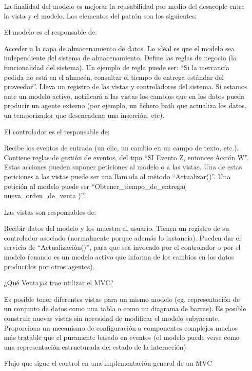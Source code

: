La finalidad del modelo es mejorar la reusabilidad por medio del desacople entre la vista y el modelo. Los elementos del patrón son
los siguientes:

El modelo es el responsable de:

    Acceder a la capa de almacenamiento de datos. Lo ideal es que el modelo sea independiente del sistema de almacenamiento.
    Define las reglas de negocio (la funcionalidad del sistema). Un ejemplo de regla puede ser: “Si la mercancía pedida no está en 
    el almacén, consultar el tiempo de entrega estándar del proveedor”.
    Lleva un registro de las vistas y controladores del sistema.
    Si estamos ante un modelo activo, notificará a las vistas los cambios que en los datos pueda producir un agente externo (por 
    ejemplo, un fichero bath que actualiza los datos, un temporizador que desencadena una inserción, etc).

El controlador es el responsable de:

    Recibe los eventos de entrada (un clic, un cambio en un campo de texto, etc.).
    Contiene reglas de gestión de eventos, del tipo “SI Evento Z, entonces Acción W”. Estas acciones pueden suponer peticiones al 
    modelo o a las vistas. Una de estas peticiones a las vistas puede ser una llamada al método “Actualizar()”. Una petición al modelo 
    puede ser “Obtener_tiempo_de_entrega( nueva_orden_de_venta )”.

Las vistas son responsables de:

    Recibir datos del modelo y los muestra al usuario.
    Tienen un registro de su controlador asociado (normalmente porque además lo instancia).
    Pueden dar el servicio de “Actualización()”, para que sea invocado por el controlador o por el modelo (cuando es un modelo activo que 
    informa de los cambios en los datos producidos por otros agentes).

¿Qué Ventajas trae utilizar el MVC?

    Es posible tener diferentes vistas para un mismo modelo (eg. representación de un conjunto de datos como una tabla o como un diagrama 
    de barras).
    Es posible construir nuevas vistas sin necesidad de modificar el modelo subyacente.
    Proporciona un mecanismo de configuración a componentes complejos muchos más tratable que el puramente basado en eventos (el modelo 
    puede verse como una representación estructurada del estado de la interacción).
    

Flujo que sigue el control en una implementación general de un MVC

